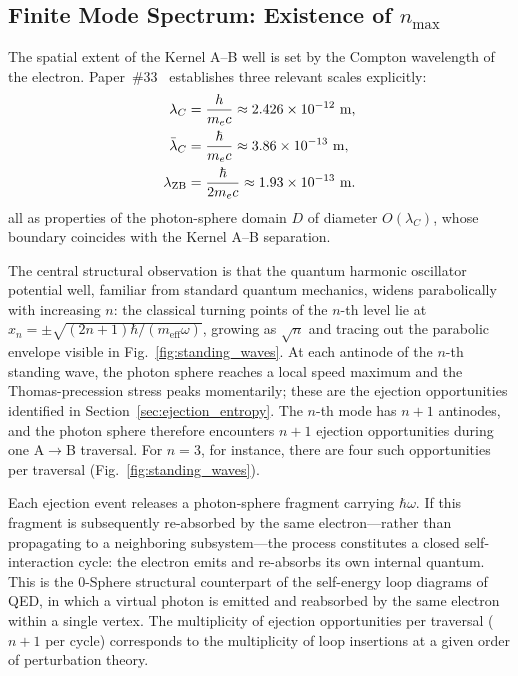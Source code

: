 \documentclass[%
 reprint, amsmath,amssymb, aps, prb, ]{revtex4-2}
\numberwithin{equation}{section}
\begin{document}
\subsection{Finite Mode Spectrum: Existence of $n_{\max}$}
\label{sec:cutoff_nmax}

The spatial extent of the Kernel A--B well is set by the Compton wavelength of the electron. Paper~\#33~\cite{hanamura33} establishes three relevant scales explicitly:
\begin{align}
\lambda_C &= \frac{h}{m_e c} \approx 2.426\times10^{-12}\ \text{m},
\notag\\
\bar\lambda_C &= \frac{\hbar}{m_e c} \approx 3.86\times10^{-13}\ \text{m},
\notag\\
\lambda_{\text{ZB}} &= \frac{\hbar}{2m_e c} \approx 1.93\times10^{-13}\ \text{m}.
\label{eq:compton_length}
\end{align}
all as properties of the photon-sphere domain $D$ of diameter $O(\lambda_C)$, whose boundary coincides with the Kernel A--B separation.

The central structural observation is that the quantum harmonic oscillator potential well, familiar from standard quantum mechanics, widens parabolically with increasing $n$: the classical turning points of the $n$-th level lie at $x_n = \pm\sqrt{(2n+1)\hbar/(m_{\text{eff}}\omega)}$, growing as $\sqrt{n}$ and tracing out the parabolic envelope visible in Fig.~\ref{fig:standing_waves}. At each antinode of the $n$-th standing wave, the photon sphere reaches a local speed maximum and the Thomas-precession stress peaks momentarily; these are the ejection opportunities identified in Section~\ref{sec:ejection_entropy}. The $n$-th mode has $n+1$ antinodes, and the photon sphere therefore encounters $n+1$ ejection opportunities during one A$\to$B traversal. For $n = 3$, for instance, there are four such opportunities per traversal (Fig.~\ref{fig:standing_waves}).

Each ejection event releases a photon-sphere fragment carrying $\hbar\omega$. If this fragment is subsequently re-absorbed by the same electron---rather than propagating to a neighboring subsystem---the process constitutes a closed self-interaction cycle: the electron emits and re-absorbs its own internal quantum. This is the 0-Sphere structural counterpart of the self-energy loop diagrams of QED, in which a virtual photon is emitted and reabsorbed by the same electron within a single vertex. The multiplicity of ejection opportunities per traversal ($n+1$ per cycle) corresponds to the multiplicity of loop insertions at a given order of perturbation theory.
\end{document}
